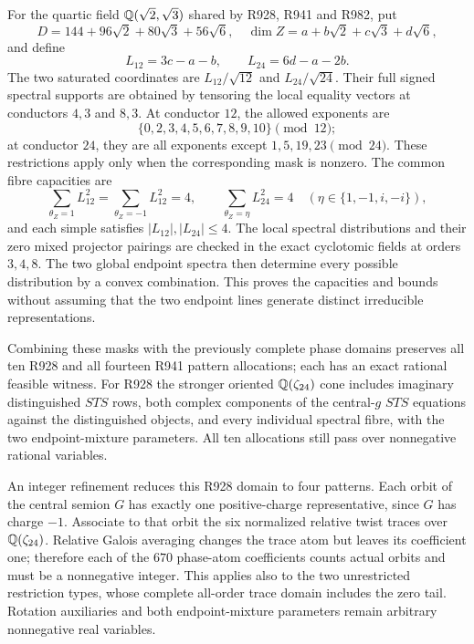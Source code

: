 For the quartic field $\mathbb Q(\sqrt2,\sqrt3)$ shared by R928, R941 and
R982, put
\[
 D=144+96\sqrt2+80\sqrt3+56\sqrt6,
 \quad \dim Z=a+b\sqrt2+c\sqrt3+d\sqrt6,
\]
and define
\[
 L_{12}=3c-a-b,\qquad L_{24}=6d-a-2b.
\]
The two saturated coordinates are $L_{12}/\sqrt{12}$ and
$L_{24}/\sqrt{24}$. Their full signed spectral supports are obtained
by tensoring the local equality vectors at conductors $4,3$ and
$8,3$. At conductor $12$, the allowed exponents are
\[
 \{0,2,3,4,5,6,7,8,9,10\}\pmod{12};
\]
at conductor $24$, they are all exponents except
$1,5,19,23\pmod{24}$. These restrictions apply only when the
corresponding mask is nonzero. The common fibre capacities are
\begin{equation}\label{eq:creative-quartic-masses}
 \sum_{\theta_Z=1}L_{12}^2=\sum_{\theta_Z=-1}L_{12}^2=4,
 \qquad
 \sum_{\theta_Z=\eta}L_{24}^2=4
       \quad(\eta\in\{1,-1,i,-i\}),
\end{equation}
and each simple satisfies $|L_{12}|,|L_{24}|\leq4$.
The local spectral distributions and their zero mixed projector
pairings are checked in the exact cyclotomic fields at orders $3,4,8$.
The two global endpoint spectra then determine every possible
distribution by a convex combination. This proves the capacities and
bounds without assuming that the two endpoint lines generate distinct
irreducible representations.

Combining these masks with the previously complete phase domains
preserves all ten R928 and all fourteen R941 pattern allocations; each
has an exact rational feasible witness. For R928 the stronger oriented
$\mathbb Q(\zeta_{24})$ cone includes imaginary distinguished $STS$ rows,
both complex components of the central-$g$ $STS$ equations against
the distinguished objects, and every individual spectral fibre, with the
two endpoint-mixture parameters. All ten allocations still pass over
nonnegative rational variables.

An integer refinement reduces this R928 domain to four patterns. Each
orbit of the central semion $G$ has exactly one positive-charge
representative, since $G$ has charge $-1$. Associate to that orbit the
six normalized relative twist traces over $\mathbb Q(\zeta_{24})$. Relative
Galois averaging changes the trace atom but leaves its coefficient one;
therefore each of the $670$ phase-atom coefficients counts actual orbits
and must be a nonnegative integer. This applies also to the two
unrestricted restriction types, whose complete all-order trace domain
includes the zero tail. Rotation auxiliaries and both endpoint-mixture
parameters remain arbitrary nonnegative real variables.

